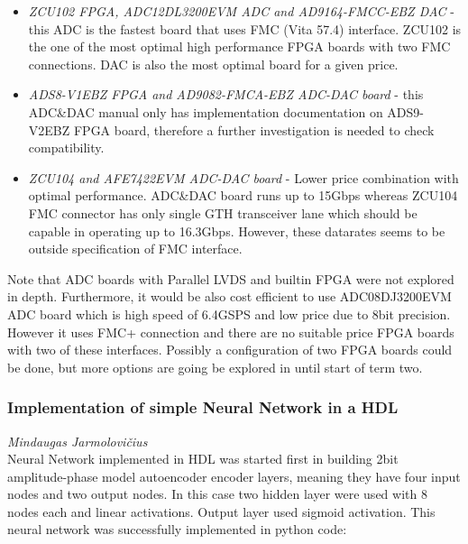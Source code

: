     \begin{itemize}
        \item \textit{ZCU102 FPGA, ADC12DL3200EVM ADC and AD9164-FMCC-EBZ DAC} - this ADC is the fastest board that uses FMC (Vita 57.4) interface. ZCU102 is the one of the most optimal high performance FPGA boards with two FMC connections. DAC is also the most optimal board for a given price. 
        \item \textit{ADS8-V1EBZ FPGA and AD9082-FMCA-EBZ ADC-DAC board} - this ADC\&DAC manual only has implementation documentation on ADS9-V2EBZ FPGA board, therefore a further investigation is needed to check compatibility.
        \item \textit{ZCU104 and AFE7422EVM ADC-DAC board} - Lower price combination with optimal performance. ADC\&DAC board runs up to 15Gbps whereas ZCU104 FMC connector has only single GTH transceiver lane which should be capable in operating up to 16.3Gbps. However, these datarates seems to be outside specification of FMC interface.
    \end{itemize}
    Note that ADC boards with Parallel LVDS and builtin FPGA were not explored in depth. Furthermore, it would be also cost efficient to use ADC08DJ3200EVM ADC board which is high speed of 6.4GSPS and low price due to 8bit precision. However it uses FMC+ connection and there are no suitable price FPGA boards with two of these interfaces. Possibly a configuration of two FPGA boards could be done, but more options are going be explored in until start of term two.
    
    \subsubsection{Implementation of simple Neural Network in a HDL}
    \label{sec:neural_network_hdl}
    \hspace*{0pt}\hfill \textit{Mindaugas Jarmolovi\v{c}ius}\\
    
        Neural Network implemented in HDL was started first in building 2bit amplitude-phase model autoencoder encoder layers, meaning they have four input nodes and two output nodes. In this case two hidden layer were used with 8 nodes each and linear activations. Output layer used sigmoid activation. This neural network was successfully implemented in python code:
        
